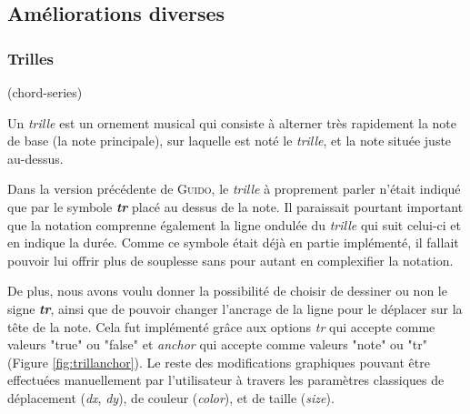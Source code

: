 \documentclass{article}
\newenvironment{gmncode}	{\vspace{-2mm}\small\verbatim}{\endverbatim\vspace{-2mm}}
\newcommand{\guido}			{\textsc{Guido}}
\begin{document}
\subsection{Améliorations diverses}\label{subsec:amelioraions}


\subsubsection{Trilles}\label{subsubsec:trilles}


\begin{gmncode}
(chord-series)
\end{gmncode}

Un \emph{trille} est \og{}un ornement musical qui consiste à alterner très rapidement la note de base (la note principale), sur laquelle est noté le \emph{trille}, et la note située juste au-dessus\fg{}.

Dans la version précédente de \guido, le \emph{trille} à proprement parler n'était indiqué que par le symbole \textit{\textbf{tr}} placé au dessus de la note. Il paraissait pourtant important que la notation comprenne également la ligne ondulée du \emph{trille} qui suit celui-ci et en indique la durée. Comme ce symbole était déjà en partie implémenté, il fallait pouvoir lui offrir plus de souplesse sans pour autant en complexifier la notation.


De plus, nous avons voulu donner la possibilité de choisir de dessiner ou non le signe \textit{\textbf{tr}}, ainsi que de pouvoir changer l'ancrage de la ligne pour le déplacer sur la tête de la note. Cela fut implémenté grâce aux options \emph{tr} qui accepte comme valeurs "true" ou "false" et \emph{anchor} qui accepte comme valeurs "note" ou "tr" (Figure \ref{fig:trillanchor}). Le reste des modifications graphiques pouvant être effectuées manuellement par l'utilisateur à travers les paramètres classiques de déplacement (\textit{dx}, \textit{dy}), de couleur (\textit{color}), et de taille (\textit{size}).
\end{document}
